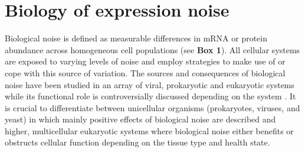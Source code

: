 
\section{Biology of expression noise} 

Biological noise is defined as measurable differences in \gls{mRNA} or protein abundance across homogeneous cell populations (see \textbf{Box 1}). 
All cellular systems are exposed to varying levels of noise and employ strategies to make use of or cope with this source of variation. The sources and consequences of biological noise have been studied in an array of viral, prokaryotic and eukaryotic systems while its functional role is controversially discussed depending on the system \citep{Raj2010, Balazsi2011, Eldar2010}. It is crucial to differentiate between unicellular organisms (prokaryotes, viruses, and yeast) in which mainly positive effects of biological noise are described and higher, multicellular eukaryotic systems where biological noise either benefits or obstructs cellular function depending on the tissue type and health state.\\

